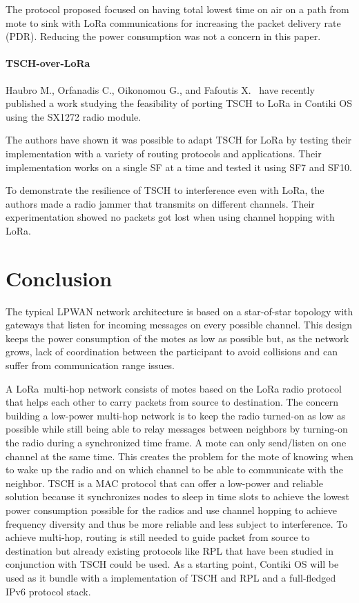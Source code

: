 
The protocol proposed focused on having total lowest time on air on a path from
mote to sink with LoRa
communications for increasing the packet delivery rate (PDR).
Reducing the power consumption was not a concern in this paper.

\paragraph{TSCH-over-LoRa}

Haubro M., Orfanadis C., Oikonomou G., and Fafoutis X.~\cite{tschoverlora}
have recently published a work studying the feasibility of porting TSCH to LoRa
in Contiki OS using the SX1272 radio module.

The authors have shown it was possible to adapt TSCH for LoRa by testing their
implementation with a variety of routing protocols and applications.
Their implementation works on a single SF at a time and tested it using
SF7 and SF10.

To demonstrate the resilience of TSCH to interference even with LoRa, the
authors made a radio jammer that transmits on different channels. Their
experimentation showed no packets got lost when using channel hopping with
LoRa.

\section{Conclusion}

The typical LPWAN network architecture is based on a star-of-star topology
with gateways that listen for incoming messages on every possible channel.
This design keeps the power consumption of the motes as low as possible
but, as the network grows, lack of coordination between the participant to avoid
collisions and can suffer from communication range issues.

A LoRa multi-hop network consists of motes based on the LoRa radio protocol
that helps each other to carry packets from source to destination.
The concern building a low-power multi-hop network is to keep
the radio turned-on as low as possible while still being able to relay
messages between neighbors by turning-on the radio during a synchronized time frame.
A mote can only send/listen on one channel at the same time.
This creates the problem for the mote of knowing when to wake up the radio and
on which channel to be able to communicate with the neighbor.
TSCH is a MAC protocol that
can offer a low-power and reliable solution because it synchronizes nodes
to sleep in time slots to achieve the lowest power consumption possible for the
radios and use channel hopping to achieve frequency diversity and thus be
more reliable and less subject to interference.
To achieve multi-hop, routing is still needed to guide packet from source
to destination but already existing protocols like RPL that have been studied
in conjunction with TSCH could be used.
As a starting point, Contiki OS will be used as it bundle with a
implementation of TSCH and RPL and a full-fledged IPv6 protocol stack.

